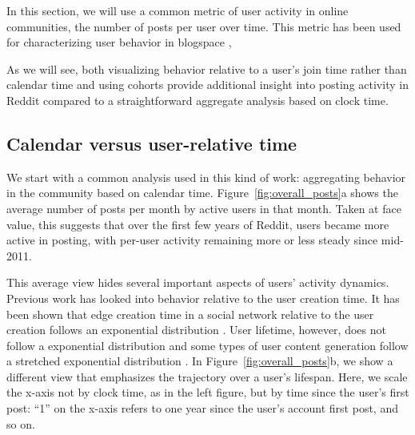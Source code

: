 
In this section, we will use a common metric of user activity in online communities, the number of posts per user over time.  This metric has been used for characterizing user behavior in blogspace \cite{Gruhl2004}, 

As we will see, both visualizing behavior relative to a user's join time rather than calendar time and using cohorts provide additional insight into posting activity in Reddit compared to a straightforward aggregate analysis based on clock time.

\subsection{Calendar versus user-relative time}

We start with a common analysis used in this kind of work: aggregating behavior in the community based on calendar time.  Figure~\ref{fig:overall_posts}a shows the average number of posts per month by active users in that month.  Taken at face value, this suggests that over the first few years of Reddit, users became more active in posting, with per-user activity remaining more or less steady since mid-2011.

This average view hides several important aspects of users' activity dynamics. Previous work has looked into behavior relative to the user creation time. It has been shown that edge creation time in a social network relative to the user creation follows an exponential distribution \cite{Tomkins2008}. User lifetime, however, does not follow a exponential distribution and some types of user content generation follow a stretched exponential distribution \cite{Guo2009}. In Figure~\ref{fig:overall_posts}b, we show a different view that emphasizes the trajectory over a user's lifespan.  Here, we scale the x-axis not by clock time, as in the left figure, but by time since the user's first post: ``1'' on the x-axis refers to one year since the user's account first post, and so on.

